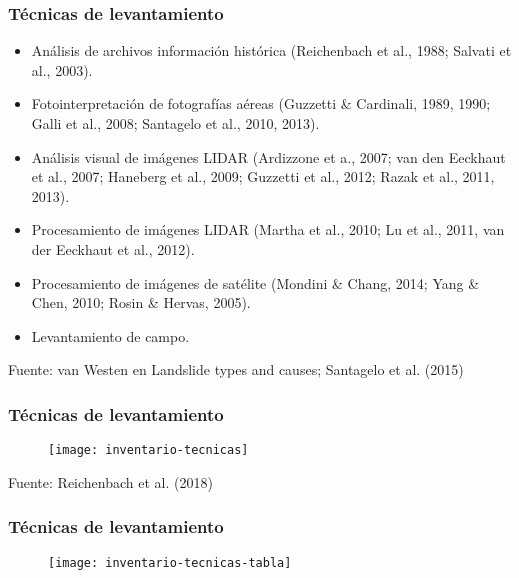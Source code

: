\documentclass[12pt]{beamer}
\begin{document}
\begin{frame}
\frametitle{Técnicas de levantamiento}
\scriptsize{
\begin{itemize}
\item Análisis de archivos información histórica (Reichenbach et al., 1988; Salvati et al., 2003).\\
\vspace{0.3cm}
\item Fotointerpretación de fotografías aéreas (Guzzetti \& Cardinali, 1989, 1990; Galli et al., 2008; Santagelo et al., 2010, 2013).\\
\vspace{0.3cm}
\item Análisis visual de imágenes LIDAR (Ardizzone et a., 2007; van den Eeckhaut et al., 2007; Haneberg et al., 2009; Guzzetti et al., 2012; Razak et al., 2011, 2013).\\
\item Procesamiento de imágenes LIDAR (Martha et al., 2010; Lu et al., 2011, van der Eeckhaut et al., 2012).\\
\vspace{0.3cm}
\item Procesamiento de imágenes de satélite (Mondini \& Chang, 2014; Yang \& Chen, 2010; Rosin \& Hervas, 2005).\\
\vspace{0.3cm}
\item Levantamiento de campo.\\
\end{itemize}
}
\vspace{1cm}
\tiny{Fuente: van Westen en Landslide types and causes; Santagelo et al. (2015)}
\end{frame}
\begin{frame}
\frametitle{Técnicas de levantamiento}
\begin{figure}
   	\texttt{[image: inventario-tecnicas]}
\end{figure}
\tiny{Fuente: Reichenbach et al. (2018)}
\end{frame}
\begin{frame}
\frametitle{Técnicas de levantamiento}
\begin{figure}
   	\texttt{[image: inventario-tecnicas-tabla]}
\end{figure}
\end{frame}
\end{document}
